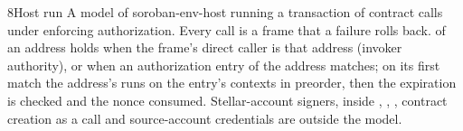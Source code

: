 \begin{perchdefinition}{8}{Host run}\label{def:host-run}
A model of soroban-env-host running a transaction of contract calls under enforcing authorization. Every call is a frame that a failure rolls back.  of an address holds when the frame's direct caller is that address (invoker authority), or when an authorization entry of the address matches; on its first match the address's  runs on the entry's contexts in preorder, then the expiration is checked and the nonce consumed. Stellar-account signers,  inside , , , contract creation as a call and source-account credentials are outside the model.
\end{perchdefinition}
